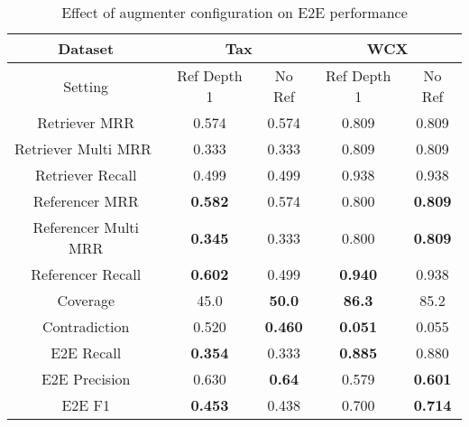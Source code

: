 \begin{table}[ht]
\centering
\caption{Effect of augmenter configuration on E2E performance}
\renewcommand{\arraystretch}{1.5} %
\label{table: augmenter_e2e_main}
\begin{tabular}{@{}c|cc|cc@{}}
\toprule
Dataset                                  & \multicolumn{2}{c|}{Tax}        & \multicolumn{2}{c}{WCX}         \\ \midrule
Setting                                  & Ref Depth 1    & No Ref         & Ref Depth 1    & No Ref         \\ \midrule
Retriever MRR                            & 0.574          & 0.574          & 0.809          & 0.809          \\
\multicolumn{1}{l|}{Retriever Multi MRR} & 0.333          & 0.333          & 0.809          & 0.809          \\
Retriever Recall                         & 0.499          & 0.499          & 0.938          & 0.938          \\
Referencer MRR                           & \textbf{0.582} & 0.574          & 0.800          & \textbf{0.809} \\
Referencer Multi MRR                     & \textbf{0.345} & 0.333          & 0.800          & \textbf{0.809} \\
Referencer Recall                        & \textbf{0.602} & 0.499          & \textbf{0.940} & 0.938          \\
Coverage                                 & 45.0           & \textbf{50.0}  & \textbf{86.3}  & 85.2           \\
Contradiction                            & 0.520          & \textbf{0.460} & \textbf{0.051} & 0.055          \\
E2E Recall                               & \textbf{0.354} & 0.333          & \textbf{0.885} & 0.880          \\
E2E Precision                            & 0.630          & \textbf{0.64}  & 0.579          & \textbf{0.601} \\
E2E F1                                   & \textbf{0.453} & 0.438          & 0.700          & \textbf{0.714} \\ \bottomrule
\end{tabular}%
\end{table}


